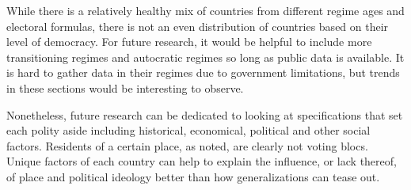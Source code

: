 \documentclass[12pt, titlepage]{article}
\begin{document}
While there is a relatively healthy mix of countries from different regime ages and electoral formulas, there is not an even distribution of countries based on their level of democracy. For future research, it would be helpful to include more transitioning regimes and autocratic regimes so long as public data is available. It is hard to gather data in their regimes due to government limitations, but trends in these sections would be interesting to observe.

Nonetheless, future research can be dedicated to looking at specifications that set each polity aside including historical, economical, political and other social factors. Residents of a certain place, as \cite{holloway_burning_2007} noted, are clearly not voting blocs. Unique factors of each country can help to explain the influence, or lack thereof, of place and political ideology better than how generalizations can tease out.       

\clearpage
\end{document}
